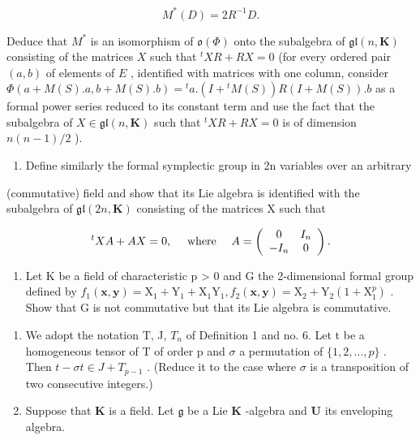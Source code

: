\[
M ^ {*} (D) = 2 R ^ {- 1} D.
\]

  Deduce that \(M^*\) is an isomorphism of \(\mathfrak{o}(\Phi)\) onto the subalgebra of \(\mathfrak{gl}(n, \mathbf{K})\) consisting of the matrices \(X\) such that \({}^{t}XR + RX = 0\) (for every ordered pair \((a, b)\) of elements of \(E\) , identified with matrices with one column, consider \(\Phi(a + M(S).a, b + M(S).b) = {}^{t}a.(I + {}^{t}M(S))R(I + M(S)).b\) as a formal power series reduced to its constant term and use the fact that the subalgebra of \(X \in \mathfrak{gl}(n, \mathbf{K})\) such that \({}^{t}XR + RX = 0\) is of dimension \(n(n - 1)/2\) ).

\begin{enumerate}
\def\labelenumi{(\alph{enumi})}
\setcounter{enumi}{2}
\tightlist
\item
  Define similarly the formal symplectic group in 2n variables over an arbitrary
\end{enumerate}

 (commutative) field and show that its Lie algebra is identified with the subalgebra of \(\mathfrak{gl}(2n,\mathbf{K})\) consisting of the matrices X such that

\[
{ } ^ { t } X A + A X = 0 , \quad \text {   where   } \quad A = \left( \begin{array} { c c } 0 & I _ { n } \\ - I _ { n } & 0 \end{array} \right) .
\]

\begin{enumerate}
\def\labelenumi{\arabic{enumi}.}
\setcounter{enumi}{26}
\tightlist
\item
  Let K be a field of characteristic p \textgreater{} 0 and G the 2-dimensional formal group defined by \(f_{1}(\mathbf{x}, \mathbf{y}) = \mathrm{X}_{1} + \mathrm{Y}_{1} + \mathrm{X}_{1}\mathrm{Y}_{1}, f_{2}(\mathbf{x}, \mathbf{y}) = \mathrm{X}_{2} + \mathrm{Y}_{2}(1 + \mathrm{X}_{1}^{p})\) . Show that G is not commutative but that its Lie algebra is commutative.
\end{enumerate}


\begin{enumerate}
\def\labelenumi{\arabic{enumi}.}
\item
  We adopt the notation T, J, \(T_{n}\) of Definition 1 and no. 6. Let t be a homogeneous tensor of T of order p and \(\sigma\) a permutation of \(\{1, 2, \ldots, p\}\) . Then \(t - \sigma t \in J + T_{p-1}\) . (Reduce it to the case where \(\sigma\) is a transposition of two consecutive integers.)
\item
  Suppose that \(\mathbf{K}\) is a field. Let \(\mathfrak{g}\) be a Lie \(\mathbf{K}\) -algebra and \(\mathbf{U}\) its enveloping algebra.
\end{enumerate}


